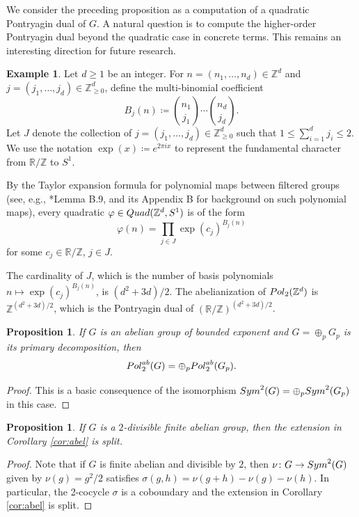 \documentclass[a4paper,11pt]{amsproc}
\theoremstyle{plain}
\newtheorem{proposition}[theorem]{Proposition}
\theoremstyle{definition}
\newtheorem{example}[theorem]{Example}
\begin{document}
We consider the preceding proposition as a computation of a quadratic Pontryagin dual of $G$. A natural question is to compute the higher-order Pontryagin dual beyond the quadratic case in concrete terms. This remains an interesting direction for future research.

\begin{example}\label{taylor}
    Let $d \geq 1$ be an integer. For $n = (n_1, \ldots, n_d) \in \mathbb{Z}^d$ and $j = (j_1, \ldots, j_d) \in \mathbb{Z}^d_{\geq 0}$, define the multi-binomial coefficient 
    \[
    B_j(n) \coloneqq \binom{n_1}{j_1} \cdots \binom{n_d}{j_d}. 
    \]
    Let $J$ denote the collection of $j = (j_1, \ldots, j_d) \in \mathbb{Z}^d_{\geq 0}$ such that $1 \leq \sum_{i=1}^d j_i \leq 2$. 
    We use the notation $\exp(x) \coloneqq e^{2\pi i x}$ to represent the fundamental character from $\mathbb{R}/\mathbb{Z}$ to $S^1$.  
    
    By the Taylor expansion formula for polynomial maps between filtered groups (see, e.g., \cite{gtz}*{Lemma B.9}, and its Appendix B for background on such polynomial maps), every quadratic $\varphi \in {\rm Quad}(\mathbb{Z}^d, S^1)$ is of the form 
    \[
    \varphi(n) = \prod_{j \in J} \exp(c_j)^{B_j(n)}
    \]    
    for some $c_j \in \mathbb{R}/\mathbb{Z}$, $j \in J$.  
    
    The cardinality of $J$, which is the number of basis polynomials $n \mapsto \exp(c_j)^{B_j(n)}$, is $(d^2 + 3d)/2$. 
    The abelianization of ${\rm Pol}_2(\mathbb{Z}^d)$ is $\mathbb{Z}^{(d^2+3d)/2}$, which is the Pontryagin dual of $(\mathbb{R}/\mathbb{Z})^{(d^2+3d)/2}$.
\end{example} 


\begin{proposition}\label{prop:primary decomposition}
If $G$ is an abelian group of bounded exponent and $G=\oplus_p G_p$ is its primary decomposition, then
$${\rm Pol}_2^{ab}(G) = \oplus_p {\rm Pol}_2^{ab}(G_p).$$
\end{proposition}
\begin{proof}
This is a basic consequence of the isomorphism ${\rm Sym}^2(G) = \oplus_p {\rm Sym}^2(G_p)$ in this case.
\end{proof}

\begin{proposition}\label{prop-split} 
If $G$ is a $2$-divisible finite abelian group, then the extension in Corollary \ref{cor:abel} is split.
\end{proposition}
\begin{proof}
Note that if $G$ is finite abelian and divisible by $2$, then
$\nu \colon G \to {\rm Sym}^2(G)$ given by $\nu(g)=g^2/2$ satisfies
$\sigma(g,h)=\nu(g+h) - \nu(g) - \nu(h)$. In particular, the 2-cocycle $\sigma$ is a coboundary and the extension in Corollary \ref{cor:abel} is split.
\end{proof}
\end{document}
